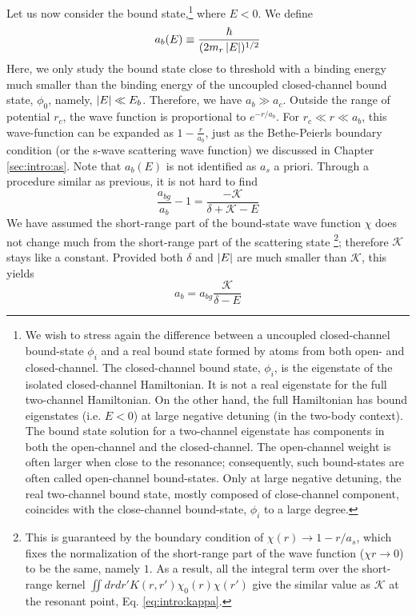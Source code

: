 Let us now consider the bound state,\footnote{We wish to stress again the difference between a uncoupled closed-channel bound-state $\phi_{i}$ and a real bound state  formed by atoms from both open- and closed-channel.   The closed-channel bound state, $\phi_{i}$, is the eigenstate of the  isolated closed-channel Hamiltonian.  It is not a real eigenstate for the full two-channel Hamiltonian.  On the other hand, the full  Hamiltonian has bound eigenstates (i.e. $E<0$) at large negative detuning (in the two-body context).  The bound state solution for a two-channel eigenstate has components in both the open-channel and the closed-channel.  The open-channel weight is often larger when close to the resonance; consequently, such bound-states are often called open-channel bound-states.  Only at large negative detuning, the real two-channel bound state, mostly composed of close-channel component, coincides with the close-channel bound-state, $\phi_{i}$ to a large degree.}
where $E<0$.  We define
\begin{equation}\label{eq:intro:ab}
a_{b}(E)\equiv\frac{\hbar}{(2m_{r}\left\lvert{E}\right\rvert)^{1/2}}
\end{equation}
 Here, we only study the bound state close to threshold with a binding energy much smaller than the binding energy of the uncoupled closed-channel bound state, $\phi_{0}$, namely, $\left\lvert{E}\right\rvert\ll{}E_{b}$.  Therefore, we have  $a_{b}\gg{a_{c}}$.  Outside the range of potential $r_{c}$,  the wave function is proportional to $e^{-r/a_{b}}$. For $r_{c}\ll{}r\ll{}a_{b}$, this wave-function can be expanded as  $1-\frac{r}{a_{b}}$, just as the Bethe-Peierls boundary condition (or the s-wave scattering wave function) we discussed in Chapter \ref{sec:intro:as}.  Note that $a_{b}(E)$ is not identified as $a_{s}$ a priori.  Through a  procedure similar as previous,  it is not hard to find
\begin{equation}
\frac{a_{bg}}{a_{b}}-1=\frac{-\mathcal{K}}{\delta+\mathcal{K}-E}
\end{equation}
We have assumed the short-range part of the bound-state wave function $\chi$ does not change much from the short-range part of the scattering state \footnote{This is guaranteed by the boundary condition of $\chi(r)\to1-r/a_{s}$, which fixes the normalization of the short-range part of the wave function ($\chi{r\to0}$) to be the same, namely $1$. As a result, all the integral term over the short-range kernel $\iint{drdr'}K(r,r')\chi_{0}(r)\chi(r')$  give the similar value as  $\mathcal{K}$ at the resonant point, Eq. \ref{eq:intro:kappa}.};  therefore $\mathcal{K}$ stays like a constant.  Provided both $\delta$ and $\left\lvert{E}\right\rvert$ are much smaller than $\mathcal{K}$, this yields\begin{equation}\label{eq:intro:abKE}
a_{b}=a_{bg}\frac{\mathcal{K}}{\delta-E}
\end{equation}
